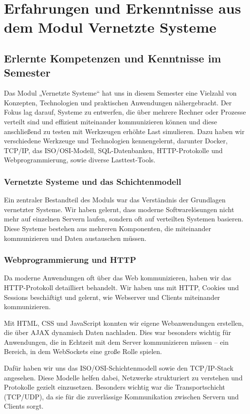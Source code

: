 \section{Erfahrungen und Erkenntnisse aus dem Modul Vernetzte Systeme}\label{Semesterrückblick}

\subsection{Erlernte Kompetenzen und Kenntnisse im Semester }
Das Modul „Vernetzte Systeme“ hat uns in diesem Semester eine Vielzahl von Konzepten, Technologien und praktischen Anwendungen nähergebracht. Der Fokus lag darauf, Systeme zu entwerfen, die über mehrere Rechner oder Prozesse verteilt sind und effizient miteinander kommunizieren können und diese anschließend zu testen mit Werkzeugen erhöhte Last simulieren. Dazu haben wir verschiedene Werkzeuge und Technologien kennengelernt, darunter Docker, TCP/IP, das ISO/OSI-Modell, SQL-Datenbanken, HTTP-Protokolle und Webprogrammierung, sowie diverse Lasttest-Tools.
\subsubsection{Vernetzte Systeme und das Schichtenmodell }
Ein zentraler Bestandteil des Moduls war das Verständnis der Grundlagen vernetzter Systeme. Wir haben gelernt, dass moderne Softwarelösungen nicht mehr auf einzelnen Servern laufen, sondern oft auf verteilten Systemen basieren. Diese Systeme bestehen aus mehreren Komponenten, die miteinander kommunizieren und Daten austauschen müssen.
\subsubsection{Webprogrammierung und HTTP }
Da moderne Anwendungen oft über das Web kommunizieren, haben wir das HTTP-Protokoll detailliert behandelt. Wir haben uns mit HTTP, Cookies und Sessions beschäftigt und gelernt, wie Webserver und Clients miteinander kommunizieren.

Mit HTML, CSS und JavaScript konnten wir eigene Webanwendungen erstellen, die über AJAX dynamisch Daten nachladen. Dies war besonders wichtig für Anwendungen, die in Echtzeit mit dem Server kommunizieren müssen – ein Bereich, in dem WebSockets eine große Rolle spielen.

Dafür haben wir uns das ISO/OSI-Schichtenmodell sowie den TCP/IP-Stack angesehen. Diese Modelle helfen dabei, Netzwerke strukturiert zu verstehen und Protokolle gezielt einzusetzen. Besonders wichtig war die Transportschicht (TCP/UDP), da sie für die zuverlässige Kommunikation zwischen Servern und Clients sorgt.
